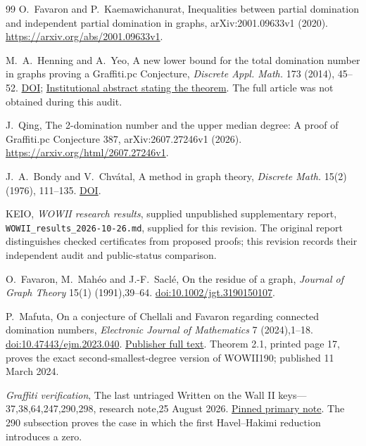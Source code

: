 \documentclass[11pt,a4paper]{article}
\theoremstyle{remark}
\begin{document}
\begin{thebibliography}{99}
O.~Favaron and P.~Kaemawichanurat,
Inequalities between partial domination and independent partial domination in graphs,
arXiv:2001.09633v1 (2020).
\url{https://arxiv.org/abs/2001.09633v1}.

M.~A.~Henning and A.~Yeo,
A new lower bound for the total domination number in graphs proving a
Graffiti.pc Conjecture, \emph{Discrete Appl. Math.} 173 (2014), 45--52.
\href{https://doi.org/10.1016/j.dam.2014.03.013}{DOI};
\href{https://pure.uj.ac.za/en/publications/a-new-lower-bound-for-the-total-domination-number-in-graphs-provi/}{Institutional abstract stating the theorem}.
The full article was not obtained during this audit.

J.~Qing, The 2-domination number and the upper median degree:
A proof of Graffiti.pc Conjecture 387,
arXiv:2607.27246v1 (2026).
\url{https://arxiv.org/html/2607.27246v1}.

J.~A.~Bondy and V.~Chv\'atal,
A method in graph theory, \emph{Discrete Math.} 15(2) (1976), 111--135.
\href{https://doi.org/10.1016/0012-365X(76)90078-9}{DOI}.

KEIO, \emph{WOWII research results}, supplied unpublished supplementary
report, \texttt{WOWII\_results\_2026-10-26.md}, supplied for this revision.
The original report distinguishes checked certificates from proposed proofs;
this revision records their independent audit and public-status comparison.

O.~Favaron, M.~Mah\'eo and J.-F.~Sacl\'e,
On the residue of a graph,
\emph{Journal of Graph Theory} 15(1) (1991),39--64.
\href{https://doi.org/10.1002/jgt.3190150107}{doi:10.1002/jgt.3190150107}.

P.~Mafuta,
On a conjecture of Chellali and Favaron regarding connected domination numbers,
\emph{Electronic Journal of Mathematics} 7 (2024),1--18.
\href{https://doi.org/10.47443/ejm.2023.040}{doi:10.47443/ejm.2023.040}.
\href{https://shahindp.com/Electron_J_Math/v7/EJM24_v7_pp1-18.pdf}{Publisher full text}.
Theorem 2.1, printed page 17, proves the exact second-smallest-degree version
of WOWII190; published 11 March 2024.

\emph{Graffiti verification},
The last untriaged Written on the Wall II keys---37,38,64,247,290,298,
research note,25 August 2026.
\href{https://gitlab.com/ai-village-agents/village/graffiti-verification/-/blob/e4f890b23a62ed8086269e52afee684db86755b3/notes/2026-08-25_wow2_last_untriaged_keys.md}{Pinned primary note}.
The 290 subsection proves the case in which the first Havel--Hakimi
reduction introduces a zero.


\end{thebibliography}
\end{document}
